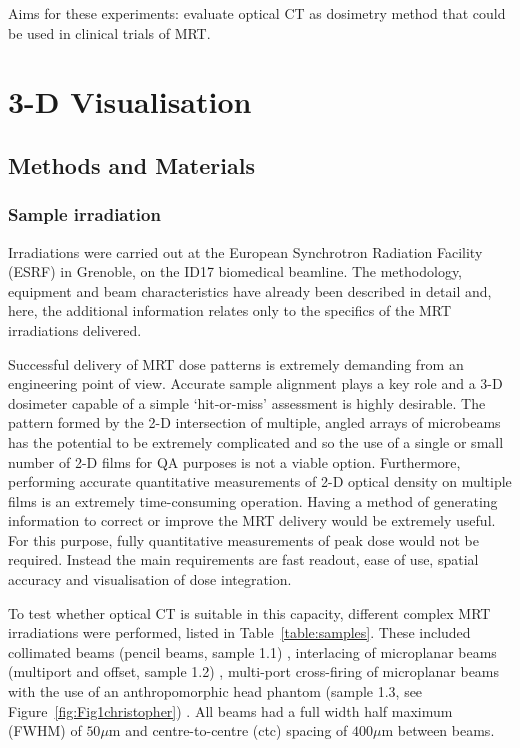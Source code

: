 	
	Aims for these experiments: evaluate optical CT as dosimetry method that could be used in clinical trials of MRT.
	
	\section{3-D Visualisation}
	\label{sec:3dvis}
	\subsection{Methods and Materials}
	
	
	\subsubsection{Sample irradiation}
	Irradiations were carried out at the European Synchrotron Radiation Facility (ESRF) in Grenoble, on the ID17 biomedical beamline. The methodology, equipment and beam characteristics have already been described in detail \cite{abdulrahmansophisticated2011 , doranestablishing2013 , doranan2010} and, here, the additional information relates only to the specifics of the MRT irradiations delivered. 
	
	Successful delivery of MRT dose patterns is extremely demanding from an engineering point of view. Accurate sample alignment plays a key role and a 3-D dosimeter capable of a simple `hit-or-miss' assessment is highly desirable. The pattern formed by the 2-D intersection of multiple, angled arrays of microbeams has the potential to be extremely complicated and so the use of a single or small number of 2-D films for QA purposes is not a viable option. Furthermore, performing accurate quantitative measurements of 2-D optical density on multiple films is an extremely time-consuming operation. Having a method of generating information to correct or improve the MRT delivery would be extremely useful. For this purpose, fully quantitative measurements of peak dose would not be required. Instead the main requirements are fast readout, ease of use, spatial accuracy and visualisation of dose integration. 
	
	To test whether optical CT is suitable in this capacity, different complex MRT irradiations were performed, listed in Table~\ref{table:samples}. These included collimated beams (pencil beams, sample 1.1) \cite{brauer-krischeffects2010}, interlacing of microplanar beams (multiport and offset, sample 1.2) \cite{serduchigh-precision2010}, multi-port cross-firing of microplanar beams with the use of an anthropomorphic head phantom (sample 1.3, see Figure~\ref{fig:Fig1christopher}) \cite{requardt2005new}. All beams had a full width half maximum (FWHM) of $50 \mu$m and centre-to-centre (ctc) spacing of $400 \mu$m between beams.
	
